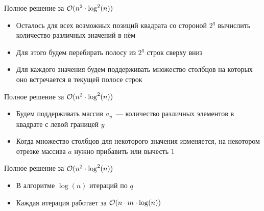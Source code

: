 \begin{frame}{Полное решение за $\mathcal{O}(n ^ 2 \cdot \log^2(n))$}
  \begin{itemize}
  \item Осталось для всех возможных позиций квадрата со стороной $2^q$ вычислить количество различных значений в нём
  \item Для этого будем перебирать полосу из $2^q$ строк сверху вниз
  \item Для каждого значения будем поддерживать множество столбцов на которых оно встречается в текущей полосе строк
  \end{itemize}
\end{frame}

\begin{frame}{Полное решение за $\mathcal{O}(n ^ 2 \cdot \log^2(n))$}
  \begin{itemize}
  \item Будем поддерживать массив $a_y$~--- количество различных элементов в квадрате с левой границей $y$
  \item Когда множество столбцов для некоторого значения изменяется, на некотором отрезке массива $a$ нужно прибавить или вычесть $1$
  \end{itemize}
\end{frame}

\begin{frame}{Полное решение за $\mathcal{O}(n ^ 2 \cdot \log^2(n))$}
  \begin{itemize}
  \item В алгоритме $\log(n)$ итераций по $q$
  \item Каждая итерация работает за $\mathcal{O}(n \cdot m \cdot \log(n))$
  \end{itemize}
\end{frame}
